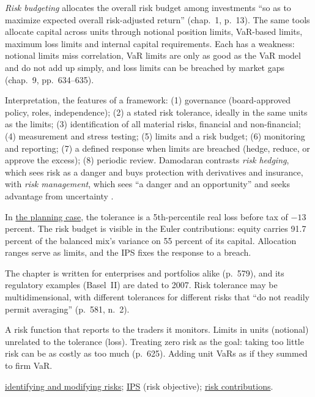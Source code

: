 \begin{qfdefinition}
\emph{Risk budgeting} allocates the overall risk budget among investments ``so as to maximize expected overall risk-adjusted return'' (chap.~1, p.~13). The same tools allocate capital across units through notional position limits, VaR-based limits, maximum loss limits and internal capital requirements. Each has a weakness: notional limits miss correlation, VaR limits are only as good as the VaR model and do not add up simply, and loss limits can be breached by market gaps (chap.~9, pp.~634--635).

 Interpretation, the features of a framework: (1) governance (board-approved policy, roles, independence); (2) a stated risk tolerance, ideally in the same units as the limits; (3) identification of all material risks, financial and non-financial; (4) measurement and stress testing; (5) limits and a risk budget; (6) monitoring and reporting; (7) a defined response when limits are breached (hedge, reduce, or approve the excess); (8) periodic review. Damodaran contrasts \emph{risk hedging}, which sees risk as a danger and buys protection with derivatives and insurance, with \emph{risk management}, which sees ``a danger and an opportunity'' and seeks advantage from uncertainty \citep[chap.~9, pp.~303--304, Table~9.7]{strategic-risk-taking-2008}.

In \hyperref[ex:investment-planning-case]{the planning case}, the tolerance is a 5th-percentile real loss before tax of $-13$ percent. The risk budget is visible in the Euler contributions: equity carries 91.7 percent of the balanced mix's variance on 55 percent of its capital. Allocation ranges serve as limits, and the IPS fixes the response to a breach.

 The chapter is written for enterprises and portfolios alike (p.~579), and its regulatory examples (Basel~II) are dated to 2007. Risk tolerance may be multidimensional, with different tolerances for different risks that ``do not readily permit averaging'' (p.~581, n.~2).

 A risk function that reports to the traders it monitors. Limits in units (notional) unrelated to the tolerance (loss). Treating zero risk as the goal: taking too little risk can be as costly as too much (p.~625). Adding unit VaRs as if they summed to firm VaR.

 \hyperref[meth:risk-identification-modification]{identifying and modifying risks}; \hyperref[meth:investment-policy-statement]{IPS} (risk objective); \hyperref[meth:equal-risk-contribution]{risk contributions}.

\end{qfdefinition}

